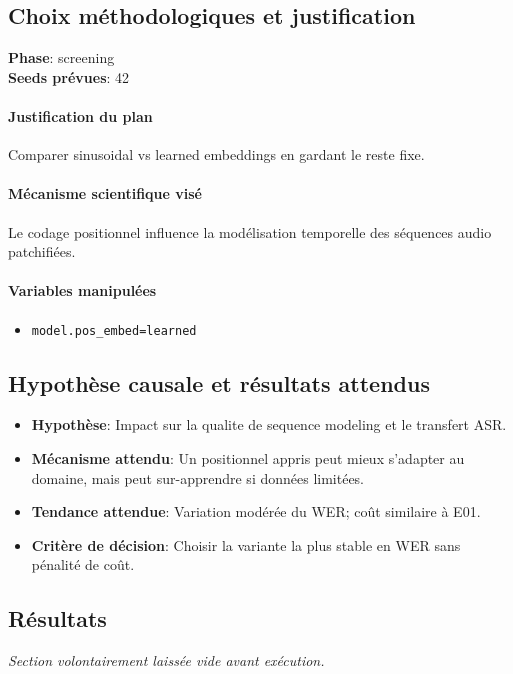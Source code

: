 \documentclass[11pt,a4paper]{article}
\begin{document}
\subsection{Choix méthodologiques et justification}
\textbf{Phase}: screening\\
\textbf{Seeds prévues}: 42\\


\paragraph{Justification du plan}
Comparer sinusoidal vs learned embeddings en gardant le reste fixe.

\paragraph{Mécanisme scientifique visé}
Le codage positionnel influence la modélisation temporelle des séquences audio patchifiées.

\paragraph{Variables manipulées}
\begin{itemize}
\item \texttt{model.pos\_embed=learned}
\end{itemize}

\subsection{Hypothèse causale et résultats attendus}
\begin{itemize}[leftmargin=1.2cm]
\item \textbf{Hypothèse}: Impact sur la qualite de sequence modeling et le transfert ASR.
\item \textbf{Mécanisme attendu}: Un positionnel appris peut mieux s'adapter au domaine, mais peut sur-apprendre si données limitées.
\item \textbf{Tendance attendue}: Variation modérée du WER; coût similaire à E01.
\item \textbf{Critère de décision}: Choisir la variante la plus stable en WER sans pénalité de coût.
\end{itemize}

\subsection{Résultats}
\textit{Section volontairement laissée vide avant exécution.}
\end{document}
